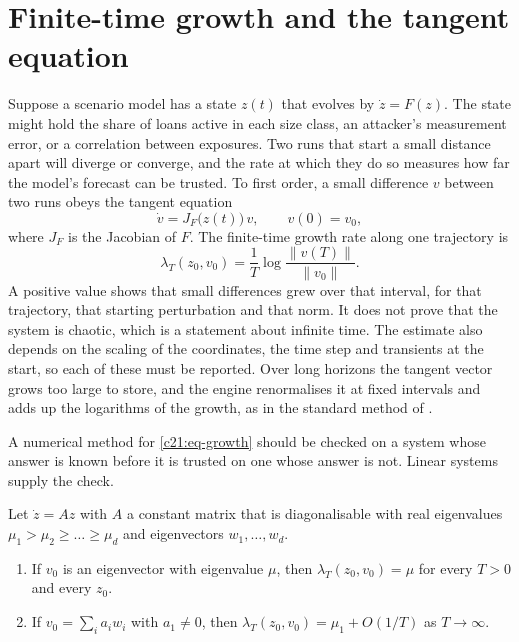 \section{Finite-time growth and the tangent equation}\label{c21:sec-growth}

Suppose a scenario model has a state $z(t)$ that evolves by $\dot z=F(z)$. The state might hold the
share of loans active in each size class, an attacker's measurement error, or a correlation
between exposures. Two runs that start a small distance apart will diverge or converge, and the
rate at which they do so measures how far the model's forecast can be trusted. To first order, a
small difference $v$ between two runs obeys the tangent equation
\begin{equation}\label{c21:eq-tangent}
\dot v=J_F\big(z(t)\big)\,v,\qquad v(0)=v_0,
\end{equation}
where $J_F$ is the Jacobian of $F$. The finite-time growth rate along one trajectory is
\begin{equation}\label{c21:eq-growth}
\lambda_T(z_0,v_0)=\frac1T\log\frac{\|v(T)\|}{\|v_0\|}.
\end{equation}
A positive value shows that small differences grew over that interval, for that trajectory, that
starting perturbation and that norm. It does not prove that the system is chaotic, which is a
statement about infinite time. The estimate also depends on the scaling of the coordinates, the
time step and transients at the start, so each of these must be reported. Over long horizons the
tangent vector grows too large to store, and the engine renormalises it at fixed intervals and
adds up the logarithms of the growth, as in the standard method of \citet{benettin1980}.

A numerical method for \eqref{c21:eq-growth} should be checked on a system whose answer is known before
it is trusted on one whose answer is not. Linear systems supply the check.

\begin{proposition}\label{c21:prop-linear}
Let $\dot z=Az$ with $A$ a constant matrix that is diagonalisable with real eigenvalues
$\mu_1>\mu_2\ge\dots\ge\mu_d$ and eigenvectors $w_1,\dots,w_d$.
\begin{enumerate}
\item If $v_0$ is an eigenvector with eigenvalue $\mu$, then $\lambda_T(z_0,v_0)=\mu$ for every $T>0$ and every $z_0$.
\item If $v_0=\sum_ia_iw_i$ with $a_1\ne0$, then $\lambda_T(z_0,v_0)=\mu_1+O(1/T)$ as $T\to\infty$.
\end{enumerate}
\end{proposition}

